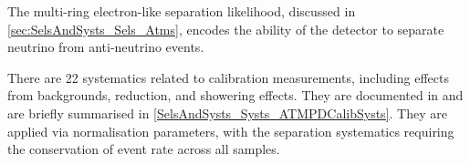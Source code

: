 The multi-ring electron-like separation likelihood, discussed in \autoref{sec:SelsAndSysts_Sels_Atms}, encodes the ability of the detector to separate neutrino from anti-neutrino events.

There are 22 systematics related to calibration measurements, including effects from backgrounds, reduction, and showering effects. They are documented in \cite{Jiang2019-iw} and are briefly summarised in \autoref{SelsAndSysts_Systs_ATMPDCalibSysts}. They are applied via normalisation parameters, with the separation systematics requiring the conservation of event rate across all samples.

